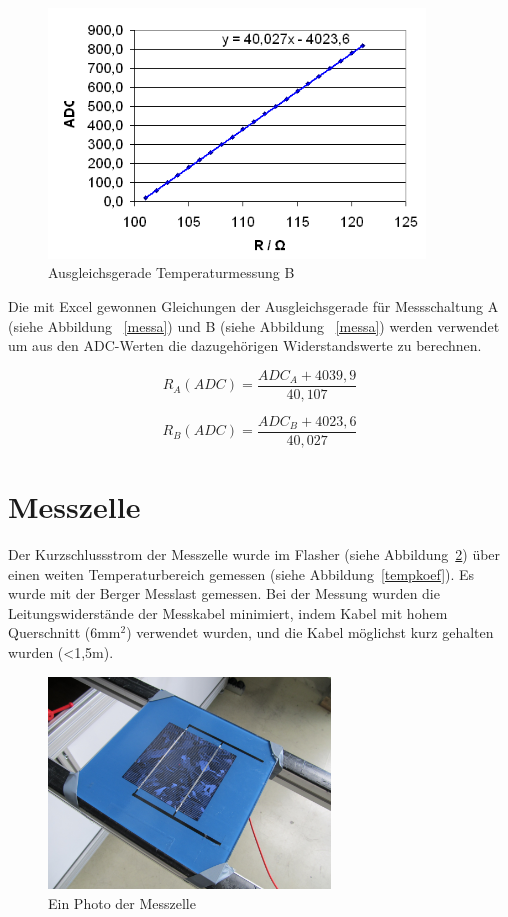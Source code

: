 \documentclass[a4paper,bibtotoc,oneside]{scrbook}
\begin{document}
\begin{figure}[htbp]
\centering
\includegraphics[width=100mm]{img/messb.png}
\caption{Ausgleichsgerade Temperaturmessung B}\label{messb}
\end{figure}

Die mit Excel gewonnen Gleichungen der Ausgleichsgerade für Messschaltung A (siehe Abbildung ~\ref{messa}) und B (siehe Abbildung ~\ref{messa}) werden verwendet um aus den ADC-Werten die dazugehörigen Widerstandswerte zu berechnen. 

  \begin{equation}
     R_A(ADC) = \frac{ADC_A + 4039,9}{40,107}
  \end{equation}
  
    \begin{equation}
     R_B(ADC) = \frac{ADC_B + 4023,6}{40,027}
  \end{equation}


\section{Messzelle}\thispagestyle{empty}


Der Kurzschlussstrom der Messzelle wurde im Flasher (siehe Abbildung~\ref{zelleflasher}) über einen weiten Temperaturbereich gemessen (siehe Abbildung~\ref{tempkoef}). Es wurde mit der Berger Messlast \cite{berger} gemessen. Bei der Messung wurden die Leitungswiderstände der Messkabel minimiert, indem Kabel mit hohem Querschnitt (6mm$^2$) verwendet wurden, und die Kabel möglichst kurz gehalten wurden (<1,5m).
 
\begin{figure}[htbp]
\centering
\includegraphics[width=75mm]{img/zelle.jpg}
\caption{Ein Photo der Messzelle}\label{zelleflasher}
\end{figure}
\end{document}
